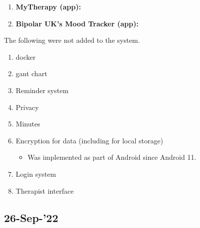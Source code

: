 \documentclass[11pt]{article}
\begin{document}
    \begin{enumerate}
        \item \textbf{MyTherapy (app):} \cite{MyTherapy}
        \item \textbf{Bipolar UK’s Mood Tracker (app):} \cite{BiPolUK}
    \end{enumerate}

    

    \printbibliography[heading=subbibintoc]



    \begin{figure}
        \label{fig:Gant Chart} %
    \end{figure}




    The following were not added to the system.

    \begin{enumerate}
        \item docker
        \item gant chart
        \item Reminder system
        \item Privacy
        \item Minutes
        \item Encryption for data (including for local storage)
        \begin{itemize}
            \item Was implemented as part of Android since Android 11.
        \end{itemize}
        \item Login system
        \item Therapist interface
    \end{enumerate}


    \subsection{26-Sep-’22}\label{subsec:26-sep-22}
\end{document}
